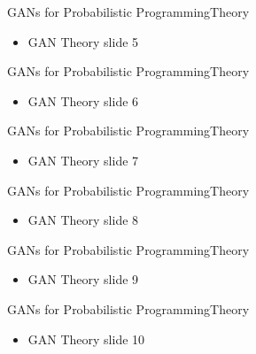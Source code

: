\documentclass[AERbeamer%
              ,optEnglish%
              ,optBiber%
              ,optBibstyleAlphabetic%
              ,optBeamerClassicFormat%
              ]{AERlatex}%
\begin{document}
\begin{frame}[c]{GANs for Probabilistic Programming}{Theory}
    \centering
    \begin{itemize}
        \item GAN Theory slide 5
    \end{itemize}
\end{frame}


\begin{frame}[c]{GANs for Probabilistic Programming}{Theory}
    \centering
    \begin{itemize}
        \item GAN Theory slide 6
    \end{itemize}
\end{frame}


\begin{frame}[c]{GANs for Probabilistic Programming}{Theory}
    \centering
    \begin{itemize}
        \item GAN Theory slide 7
    \end{itemize}
\end{frame}


\begin{frame}[c]{GANs for Probabilistic Programming}{Theory}
    \centering
    \begin{itemize}
        \item GAN Theory slide 8
    \end{itemize}
\end{frame}


\begin{frame}[c]{GANs for Probabilistic Programming}{Theory}
    \centering
    \begin{itemize}
        \item GAN Theory slide 9
    \end{itemize}
\end{frame}


\begin{frame}[c]{GANs for Probabilistic Programming}{Theory}
    \centering
    \begin{itemize}
        \item GAN Theory slide 10
    \end{itemize}
\end{frame}
\end{document}
